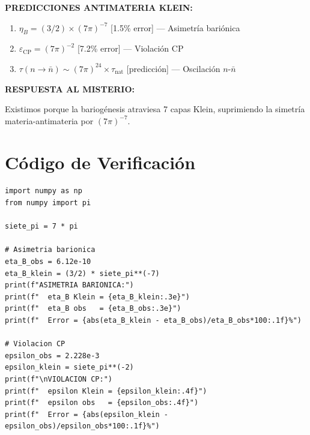 \begin{tcolorbox}[colback=kleingray, colframe=kleinblue, title=\textbf{Resumen del Capítulo 7}]

\textbf{PREDICCIONES ANTIMATERIA KLEIN:}

\begin{enumerate}
    \item $\eta_B = (3/2) \times (7\pi)^{-7}$ \hfill [1.5\% error] --- Asimetría bariónica
    \item $\varepsilon_{\text{CP}} = (7\pi)^{-2}$ \hfill [7.2\% error] --- Violación CP
    \item $\tau(n \to \bar{n}) \sim (7\pi)^{24} \times \tau_{\text{nat}}$ \hfill [predicción] --- Oscilación $n$-$\bar{n}$
\end{enumerate}

\vspace{0.3cm}
\textbf{RESPUESTA AL MISTERIO:}

Existimos porque la bariogénesis atraviesa 7 capas Klein,
suprimiendo la simetría materia-antimateria por $(7\pi)^{-7}$.

\end{tcolorbox}


\section*{Código de Verificación}

\begin{lstlisting}[caption={Verificación numérica - Capítulo 7}]
import numpy as np
from numpy import pi

siete_pi = 7 * pi

# Asimetria barionica
eta_B_obs = 6.12e-10
eta_B_klein = (3/2) * siete_pi**(-7)
print(f"ASIMETRIA BARIONICA:")
print(f"  eta_B Klein = {eta_B_klein:.3e}")
print(f"  eta_B obs   = {eta_B_obs:.3e}")
print(f"  Error = {abs(eta_B_klein - eta_B_obs)/eta_B_obs*100:.1f}%")

# Violacion CP
epsilon_obs = 2.228e-3
epsilon_klein = siete_pi**(-2)
print(f"\nVIOLACION CP:")
print(f"  epsilon Klein = {epsilon_klein:.4f}")
print(f"  epsilon obs   = {epsilon_obs:.4f}")
print(f"  Error = {abs(epsilon_klein - epsilon_obs)/epsilon_obs*100:.1f}%")
\end{lstlisting}
